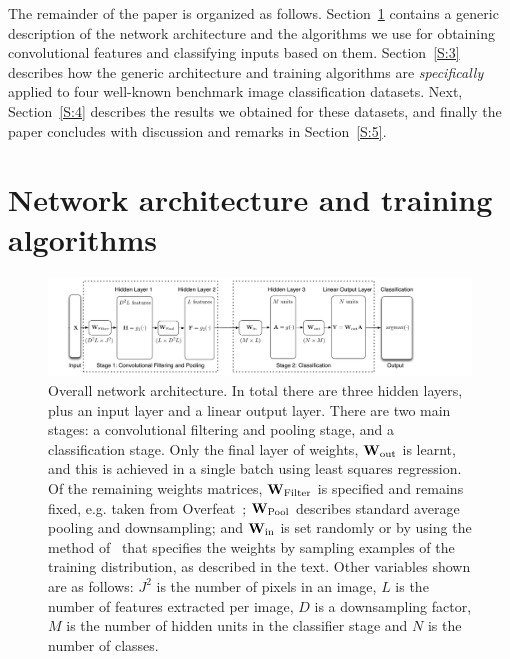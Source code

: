 \documentclass[conference]{IEEEtran}
\begin{document}
The remainder of the paper is organized as follows. Section~\ref{S:2} contains a generic description of the network architecture and the algorithms we use for obtaining convolutional features and classifying inputs based on them. Section~\ref{S:3} describes how the generic architecture and training algorithms are {\em specifically} applied to four well-known benchmark image classification datasets. Next, Section~\ref{S:4} describes the results we obtained for these datasets, and finally the paper concludes with discussion and remarks in Section~\ref{S:5}.

%




\section{Network architecture and training algorithms}\label{S:2}

\begin{figure}[!ht]
\centering
\includegraphics[width=2\columnwidth]{IJCNN2015_network_v4}
 \caption{Overall network architecture. In total there are three hidden layers, plus an input layer and a linear output layer. There are two main stages: a convolutional filtering and pooling stage, and a classification stage. Only the final layer of weights, ${\bf W}_{\rm out}$ is learnt, and this is achieved in a single batch using least squares regression. Of the remaining weights matrices, ${\bf W}_{\rm Filter}$ is specified and remains fixed, e.g. taken from Overfeat~\cite{Sermanet.14_overfeat}; ${\bf W}_{\rm  Pool}$ describes standard average pooling and downsampling; and ${\bf W}_{\rm in}$ is set randomly or by using the method of~\cite{Zhu.15} that specifies the weights by sampling examples of the training distribution, as described in the text. Other variables shown are as follows: $J^2$ is the number of pixels in an image, $L$ is the number of features extracted per image, $D$ is a downsampling factor,  $M$ is the number of hidden units in the classifier stage and $N$ is the number of classes. }
\label{fig_sim}
\end{figure}
\end{document}
